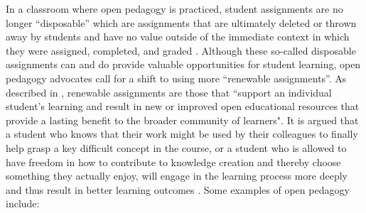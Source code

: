 \documentclass[11pt]{article}
\begin{document}
In a classroom where open pedagogy is practiced, student assignments are no longer ``disposable'' which are assignments that are ultimately deleted or thrown away by students and have no value outside of the immediate context in which they were assigned, completed, and graded \cite{DW:13, DW-JH:18}. Although these so-called disposable assignments can and do provide valuable opportunities for student learning, open pedagogy advocates call for a shift to using more ``renewable assignments''. As described in \cite{DW:13, DW-JH:18}, renewable assignments are those that ``support an individual student's learning and result in new or improved open educational resources that provide a lasting benefit to the broader community of learners".  It is argued that a student who knows that their work might be used by their colleagues to finally help grasp a key difficult concept in the course, or a student who is allowed to have freedom in how to contribute to knowledge creation and thereby choose something they actually enjoy, will engage in the learning process more deeply and thus result in better learning outcomes \cite{DW:13, DW-JH:18}.  Some examples of open pedagogy include:
\end{document}
